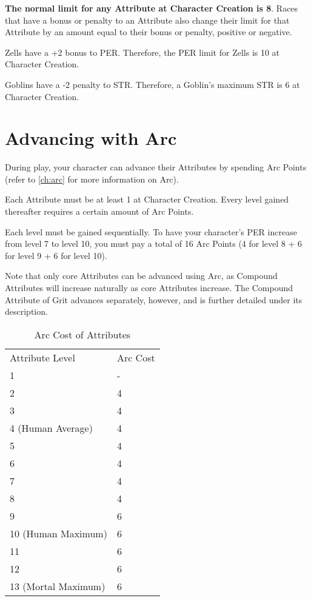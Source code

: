 \documentclass[oneside,11pt,english]{book}
\begin{document}
\textbf{The normal limit for any Attribute at Character Creation is 8}. Races that have a bonus or penalty to an 
Attribute also change their limit for that Attribute by an amount equal to their bonus or penalty, positive 
or negative. 
 

Zells have a +2 bonus to PER. Therefore, the PER limit for Zells is 10 at Character Creation. 

 
Goblins have a -2 penalty to STR. Therefore, a Goblin’s maximum STR is 6 at Character Creation. 
\section{Advancing with Arc}
During play, your character can advance their Attributes by spending Arc Points (refer to \autoref{ch:arc} for 
more information on Arc). 
 

Each Attribute must be at least 1 at Character Creation. Every level gained thereafter requires a certain 
amount of Arc Points. 

 
Each level must be gained sequentially. To have your character’s PER increase from level 7 to level 10, 
you must pay a total of 16 Arc Points (4 for level 8 + 6 for level 9 + 6 for level 10). 
 

Note that only core Attributes can be advanced using Arc, as Compound Attributes will increase naturally 
as core Attributes increase. The Compound Attribute of Grit advances separately, however, and is further 
detailed under its description. 
\begin{table}
	\caption{Arc Cost of Attributes}
	\label{tab:AttribsArcCost}
\begin{tabu} spread 0pt {Xl}
Attribute Level & Arc Cost\\
1& -                        \\
2& 4                        \\
3& 4                        \\
4 (Human Average)& 4        \\
5& 4                        \\
6& 4                        \\
7& 4                        \\
8& 4                        \\
9& 6                        \\
10 (Human Maximum)& 6       \\
11& 6                       \\
12& 6                       \\
13 (Mortal Maximum)& 6      \\
\end{tabu}
\end{table}
\end{document}
